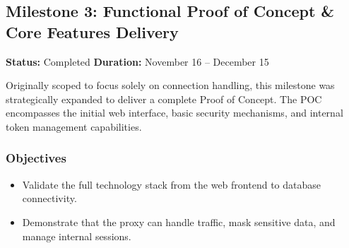 
\subsection{Milestone 3: Functional Proof of Concept \& Core Features Delivery}
\textbf{Status:} Completed \hfill \textbf{Duration:} November 16 -- December 15

Originally scoped to focus solely on connection handling, this milestone was strategically expanded to deliver a complete Proof of Concept. The POC encompasses the initial web interface, basic security mechanisms, and internal token management capabilities.

\subsubsection{Objectives}
\begin{itemize}
    \item Validate the full technology stack from the web frontend to database connectivity.
    \item Demonstrate that the proxy can handle traffic, mask sensitive data, and manage internal sessions.
\end{itemize}

